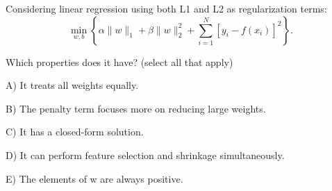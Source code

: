 Considering linear regression using both L1 and L2 as regularization terms:
\[
\min_{w,b}\left\{\alpha\|w\|_1+\beta\|w\|_2^2+
\sum_{i=1}^N[y_i-f(x_i)]^2\right\}.
\]


Which properties does it have? (select all that apply)


A) It treats all weights equally.


B) The penalty term focuses more on reducing large weights.


C) It has a closed-form solution.


D) It can perform feature selection and shrinkage simultaneously.


E) The elements of w are always positive.
